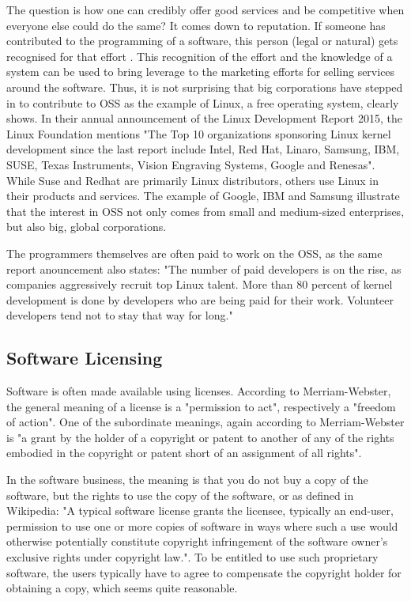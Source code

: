 \documentclass[a4paper]{report}
\begin{document}
The question is how one can credibly offer good services and be competitive when everyone else could do the same? It comes down to reputation. If someone has contributed to the programming of a software, this person (legal or natural) gets recognised for that effort \parencite{OpenSourceMovement}. This recognition of the effort and the knowledge of a system can be used to bring leverage to the marketing efforts for selling services around the software. Thus, it is not surprising that big corporations have stepped in to contribute to OSS as the example of Linux, a free operating system, clearly shows. In their annual announcement of the Linux Development Report 2015, the Linux Foundation mentions "The Top 10 organizations sponsoring Linux kernel development since the last report include Intel, Red Hat, Linaro, Samsung, IBM, SUSE, Texas Instruments, Vision Engraving Systems, Google and Renesas"\parencite{LinuxReport}. While Suse and Redhat are primarily Linux distributors, others use Linux in their products and services. The example of Google, IBM and Samsung illustrate that the interest in OSS not only comes from small and medium-sized enterprises, but also big, global corporations.

The programmers themselves are often paid to work on the OSS, as the same report anouncement also states: "The number of paid developers is on the rise, as companies aggressively recruit top Linux talent. More than 80 percent of kernel development is done by developers who are being paid for their work. Volunteer developers tend not to stay that way for long."

\subsection{Software Licensing}
\label{ssec:SLic}
Software is often made available using licenses. According to Merriam-Webster, the general meaning of a license is a "permission to act", respectively a "freedom of action"\parencite{WebstLic}. One of the subordinate meanings, again according to Merriam-Webster is "a grant by the holder of a copyright or patent to another of any of the rights embodied in the copyright or patent short of an assignment of all rights". 

In the software business, the meaning is that you do not buy a copy of the software, but the rights to use the copy of the software, or as defined in Wikipedia: "A typical software license grants the licensee, typically an end-user, permission to use one or more copies of software in ways where such a use would otherwise potentially constitute copyright infringement of the software owner's exclusive rights under copyright law."\parencite{WikiSoftLic}. To be entitled to use such proprietary software, the users typically have to agree to compensate the copyright holder for obtaining a copy, which seems quite reasonable. 
\end{document}
